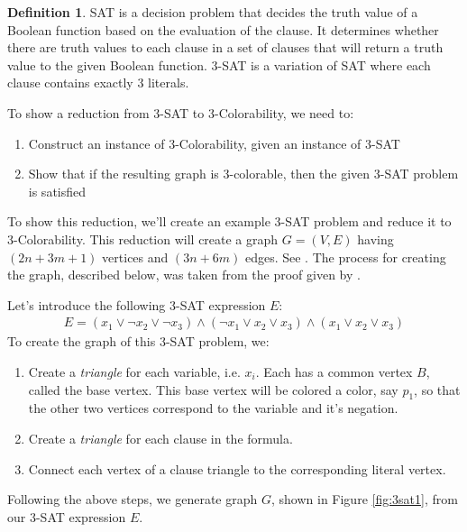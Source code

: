 \documentclass{article}
\theoremstyle{definition}
\newtheorem{definition}{Definition}
\begin{document}
\begin{definition}\label{def:sat}
SAT is a decision problem that decides the truth value of a Boolean function based on the evaluation of the clause. It determines whether there are truth values to each clause in a set of clauses that will return a truth value to the given Boolean function. 3-SAT is a variation of SAT where each clause contains exactly 3 literals.
\end{definition}

To show a reduction from 3-SAT to 3-Colorability, we need to:

\begin{enumerate}
\item Construct an instance of 3-Colorability, given an instance of 3-SAT
\item Show that if the resulting graph is 3-colorable, then the given 3-SAT problem is satisfied
\end{enumerate}

To show this reduction, we'll create an example 3-SAT problem and reduce it to 3-Colorability. This reduction will create a graph \(G = (V, E)\) having \((2n + 3m + 1)\) vertices and \((3n+6m)\) edges. See \citet{moret}. The process for creating the graph, described below, was taken from the proof given by \citet{sharma}.

Let's introduce the following 3-SAT expression $E$:
%
\begin{align*}
E = \left( x_1 \vee \neg x_2 \vee \neg x_3 \right) \wedge \left( \neg x_1 \vee x_2 \vee x_3 \right) \wedge \left( x_1 \vee x_2 \vee x_3 \right)
\end{align*}
%
To create the graph of this 3-SAT problem, we:
\begin{enumerate}
\item Create a \emph{triangle} for each variable, i.e. \(x_i\). Each has a common vertex \(B\), called the base vertex. This base vertex will be colored a color, say \(p_1\), so that the other two vertices correspond to the variable and it's negation.
\item Create a \emph{triangle} for each clause in the formula.
\item Connect each vertex of a clause triangle to the corresponding literal vertex.
\end{enumerate}

Following the above steps, we generate graph $G$, shown in Figure \ref{fig:3sat1}, from our 3-SAT expression $E$.
\end{document}
